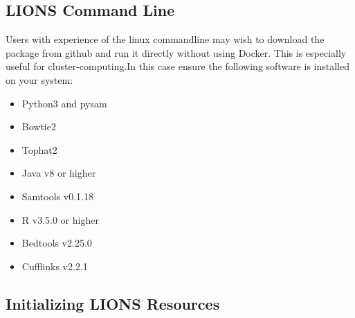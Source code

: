 \documentclass[11pt]{scrartcl}
\begin{document}
\vspace{2em}
\subsection{LIONS Command Line}

Users with experience of the linux commandline may wish to download the package from github and run it directly without using Docker. This is especially useful for cluster-computing.In this case ensure the following software is installed on your system: 

\begin{itemize}
\item Python3 and pysam
\item Bowtie2
\item Tophat2
\item Java v8 or higher
\item Samtools v0.1.18
\item R v3.5.0 or higher
\item Bedtools v2.25.0
\item Cufflinks v2.2.1
\end{itemize}

\subsection{Initializing LIONS Resources}
\end{document}
